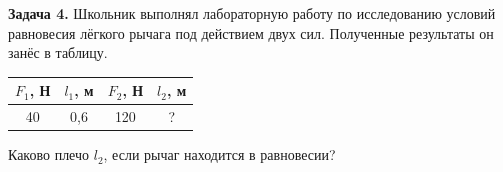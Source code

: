 
\begin{taskbasic}[code={\label{task:statics_v01_n04}}]
\textbf{Задача 4.} Школьник выполнял лабораторную работу по исследованию условий равновесия лёгкого рычага под действием двух сил. Полученные результаты он занёс в таблицу.

\begin{center}
\begin{tabular}{|c|c|c|c|}
\hline
$F_{1}$, Н & $l_{1}$, м & $F_{2}$, Н & $l_{2}$, м \\ \hline
40 & 0{,}6 & 120 & ? \\ \hline
\end{tabular}
\end{center}

Каково плечо $l_{2}$, если рычаг находится в равновесии?

\end{taskbasic}

